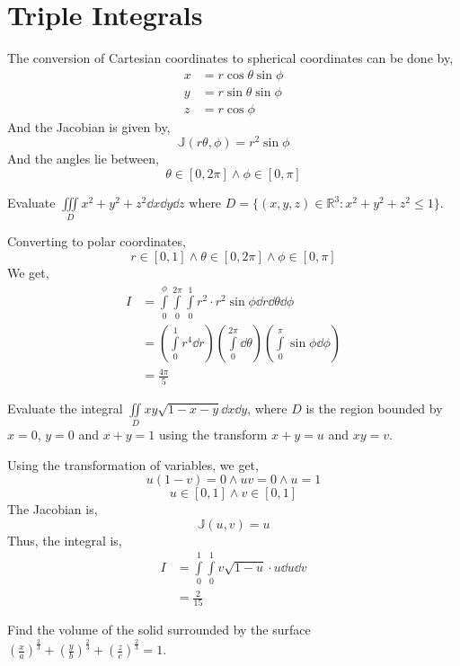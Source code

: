 \section{Triple Integrals}
\begin{theorem}
	The conversion of Cartesian coordinates to spherical coordinates can be done by,
	\[\begin{split}
		x&=r\cos\theta\sin\phi\\
		y&=r\sin\theta\sin\phi\\
		z&=r\cos\phi
	\end{split}\]
	And the Jacobian is given by,
	\[\mathbb{J}(r\theta,\phi)=r^2\sin\phi\]
	And the angles lie between,
	\[\theta \in [0,2\pi] \land \phi\in[0,\pi] \]
\end{theorem}
\begin{eg}
	Evaluate $\iiint\limits_D x^2+y^2+z^2\dd{x}\dd{y}\dd{z}$ where $D=\{(x,y,z)\in\mathbb{R}^3 : x^2+y^2+z^2\leq 1\}$.
\end{eg}
\begin{explanation}
	Converting to polar coordinates,
	\[r\in[0,1]\land \theta\in[0,2\pi]\land \phi\in[0,\pi]\]
	We get,
	\[\begin{split}
		I&=\int\limits_0^\phi\int\limits_0^{2\pi}\int\limits_0^1 r^2\cdot r^2\sin\phi\dd{r}\dd{\theta}\dd{\phi}\\
		&=\left(\int\limits_0^1r^4\dd{r}\right)\left(\int\limits_0^{2\pi}\dd{\theta}\right)\left(\int\limits_0^\pi\sin\phi\dd{\phi}\right)\\
		&=\frac{4\pi}{5}
	\end{split}\]
\end{explanation}
\begin{eg}
	Evaluate the integral $\iint\limits_D xy\sqrt{1-x-y}\dd{x}\dd{y}$, where $D$ is the region bounded by $x=0$, $y=0$ and $x+y=1$ using the transform $x+y=u$ and $xy=v$.
\end{eg}
\begin{explanation}
	Using the transformation of variables, we get,
	\[u(1-v)=0\land uv=0\land u=1\]
	\[u\in[0,1]\land v\in[0,1]\]
	The Jacobian is,
	\[\mathbb{J}(u,v)=u\]
	Thus, the integral is,
	\[\begin{split}
		I&=\int\limits_0^1\int\limits_0^1v\sqrt{1-u}\cdot u\dd{u}\dd{v}\\
		&=\frac{2}{15}
	\end{split}\]
\end{explanation}
\begin{eg}
	Find the volume of the solid surrounded by the surface $\left(\frac{x}{a}\right)^\frac{2}{3}+\left(\frac{y}{b}\right)^\frac{2}{3}+\left(\frac{z}{c}\right)^\frac{2}{3}=1$.
\end{eg}

